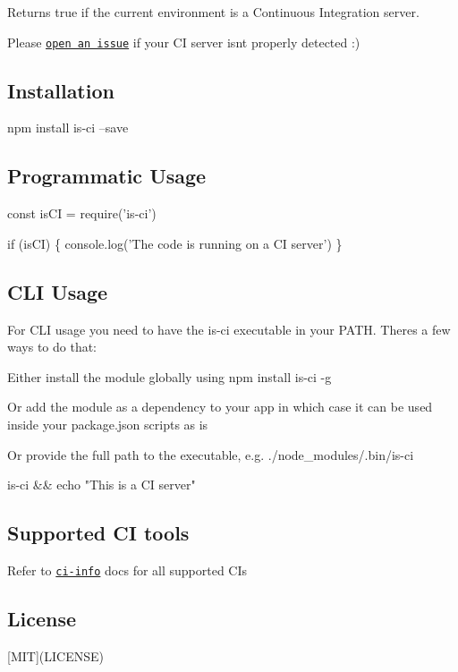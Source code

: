 Returns {\ttfamily true} if the current environment is a Continuous Integration server.

Please \href{https://github.com/watson/is-ci/issues}{\tt open an issue} if your CI server isn\textquotesingle{}t properly detected \+:)

\href{https://www.npmjs.com/package/is-ci}{\tt } \href{https://travis-ci.org/watson/is-ci}{\tt } \href{https://github.com/feross/standard}{\tt }

\subsection*{Installation}


\begin{DoxyCode}
npm install is-ci --save
\end{DoxyCode}


\subsection*{Programmatic Usage}


\begin{DoxyCode}
const isCI = require('is-ci')

if (isCI) \{
  console.log('The code is running on a CI server')
\}
\end{DoxyCode}


\subsection*{C\+LI Usage}

For C\+LI usage you need to have the {\ttfamily is-\/ci} executable in your {\ttfamily P\+A\+TH}. There\textquotesingle{}s a few ways to do that\+:


\begin{DoxyItemize}
\item Either install the module globally using {\ttfamily npm install is-\/ci -\/g}
\item Or add the module as a dependency to your app in which case it can be used inside your package.\+json scripts as is
\item Or provide the full path to the executable, e.\+g. {\ttfamily ./node\+\_\+modules/.bin/is-\/ci}
\end{DoxyItemize}


\begin{DoxyCode}
is-ci && echo "This is a CI server"
\end{DoxyCode}


\subsection*{Supported CI tools}

Refer to \href{https://github.com/watson/ci-info#supported-ci-tools}{\tt ci-\/info} docs for all supported CI\textquotesingle{}s

\subsection*{License}

\mbox{[}M\+IT\mbox{]}(L\+I\+C\+E\+N\+SE) 